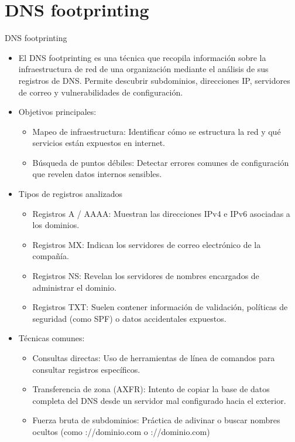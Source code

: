 \documentclass[aspectratio=169,11pt]{beamer}
\begin{document}
\section{DNS footprinting}


\begin{frame}[allowframebreaks]{DNS footprinting}
\small
  \begin{itemize}
  \item El DNS footprinting es una técnica que recopila información sobre la infraestructura de red de una organización mediante el análisis de sus registros de DNS. Permite descubrir subdominios, direcciones IP, servidores de correo y vulnerabilidades de configuración.
  \item Objetivos principales:
  \begin{itemize}
  \item Mapeo de infraestructura: Identificar cómo se estructura la red y qué servicios están expuestos en internet.
  \item Búsqueda de puntos débiles: Detectar errores comunes de configuración que revelen datos internos sensibles.
  \end{itemize}

  \item Tipos de registros analizados
    \begin{itemize}

 \item Registros A / AAAA: Muestran las direcciones IPv4 e IPv6 asociadas a los dominios.
 \item Registros MX: Indican los servidores de correo electrónico de la compañía.
 \item Registros NS: Revelan los servidores de nombres encargados de administrar el dominio.
 \item Registros TXT: Suelen contener información de validación, políticas de seguridad (como SPF) o datos accidentales expuestos.
   \end{itemize}

 \item Técnicas comunes:
 
      \begin{itemize}
 \item Consultas directas: Uso de herramientas de línea de comandos para consultar registros específicos.
 \item Transferencia de zona (AXFR): Intento de copiar la base de datos completa del DNS desde un servidor mal configurado hacia el exterior.
 \item Fuerza bruta de subdominios: Práctica de adivinar o buscar nombres ocultos (como ://dominio.com o ://dominio.com)
   \end{itemize}



\end{itemize}
\end{frame}
\end{document}
